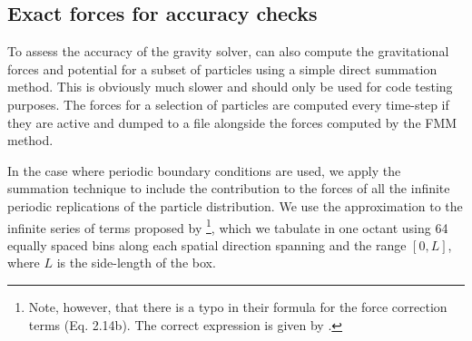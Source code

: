 \subsection{Exact forces for accuracy checks}
\label{ssec:exact_forces}

To assess the accuracy of the gravity solver, \swift can also compute
the gravitational forces and potential for a subset of particles using
a simple direct summation method. This is obviously much slower and
should only be used for code testing purposes. The forces for a
selection of particles are computed every time-step if they are active
and dumped to a file alongside the forces computed by the FMM method.

In the case where periodic boundary conditions are used, we apply the
\cite{Ewald1921} summation technique to include the contribution to
the forces of all the infinite periodic replications of the particle
distribution. We use the approximation to the infinite series of terms
proposed by \cite{Hernquist1991}\footnote{Note, however, that there is
  a typo in their formula for the force correction terms
  (Eq. 2.14b). The correct expression is given by \cite{Klessen1997}
  \citep[see also][]{Hubber2011}.}, which we tabulate in one octant
using 64 equally spaced bins along each spatial direction spanning and
the range $[0,L]$, where $L$ is the side-length of the box.
